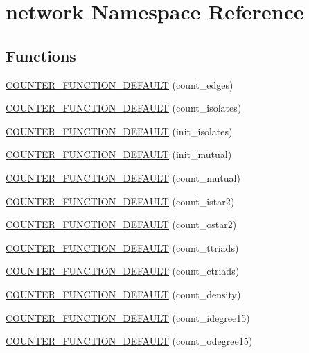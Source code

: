 \hypertarget{namespacenetwork}{}\section{network Namespace Reference}
\label{namespacenetwork}
\subsection*{Functions}
\begin{DoxyCompactItemize}
\item 
\hyperlink{namespacenetwork_a52e5467dc2136f576b9c24e68ce5bb69}{C\+O\+U\+N\+T\+E\+R\+\_\+\+F\+U\+N\+C\+T\+I\+O\+N\+\_\+\+D\+E\+F\+A\+U\+LT} (count\+\_\+edges)
\item 
\hyperlink{namespacenetwork_af8767376332b477ad0be01a2d68b2231}{C\+O\+U\+N\+T\+E\+R\+\_\+\+F\+U\+N\+C\+T\+I\+O\+N\+\_\+\+D\+E\+F\+A\+U\+LT} (count\+\_\+isolates)
\item 
\hyperlink{namespacenetwork_a0df1bc899c523c581cef5489290d1360}{C\+O\+U\+N\+T\+E\+R\+\_\+\+F\+U\+N\+C\+T\+I\+O\+N\+\_\+\+D\+E\+F\+A\+U\+LT} (init\+\_\+isolates)
\item 
\hyperlink{namespacenetwork_a1e12cd378041890c578b5ed2153c93e8}{C\+O\+U\+N\+T\+E\+R\+\_\+\+F\+U\+N\+C\+T\+I\+O\+N\+\_\+\+D\+E\+F\+A\+U\+LT} (init\+\_\+mutual)
\item 
\hyperlink{namespacenetwork_afbe5ab8aa0a6079fc233508861e9edae}{C\+O\+U\+N\+T\+E\+R\+\_\+\+F\+U\+N\+C\+T\+I\+O\+N\+\_\+\+D\+E\+F\+A\+U\+LT} (count\+\_\+mutual)
\item 
\hyperlink{namespacenetwork_a3e6d0bc978cbb2a6306172ddfb80b2a1}{C\+O\+U\+N\+T\+E\+R\+\_\+\+F\+U\+N\+C\+T\+I\+O\+N\+\_\+\+D\+E\+F\+A\+U\+LT} (count\+\_\+istar2)
\item 
\hyperlink{namespacenetwork_af92e2d3fcc16d630145a06ae65ca7c41}{C\+O\+U\+N\+T\+E\+R\+\_\+\+F\+U\+N\+C\+T\+I\+O\+N\+\_\+\+D\+E\+F\+A\+U\+LT} (count\+\_\+ostar2)
\item 
\hyperlink{namespacenetwork_a2bdb873a06e21affe474527ce9065667}{C\+O\+U\+N\+T\+E\+R\+\_\+\+F\+U\+N\+C\+T\+I\+O\+N\+\_\+\+D\+E\+F\+A\+U\+LT} (count\+\_\+ttriads)
\item 
\hyperlink{namespacenetwork_ad8110b709867cea84d51779fedac9a56}{C\+O\+U\+N\+T\+E\+R\+\_\+\+F\+U\+N\+C\+T\+I\+O\+N\+\_\+\+D\+E\+F\+A\+U\+LT} (count\+\_\+ctriads)
\item 
\hyperlink{namespacenetwork_a2e68995185f67126ee08da5b78d1d2ac}{C\+O\+U\+N\+T\+E\+R\+\_\+\+F\+U\+N\+C\+T\+I\+O\+N\+\_\+\+D\+E\+F\+A\+U\+LT} (count\+\_\+density)
\item 
\hyperlink{namespacenetwork_af6d3618f2abd7302ed35590dc073a30e}{C\+O\+U\+N\+T\+E\+R\+\_\+\+F\+U\+N\+C\+T\+I\+O\+N\+\_\+\+D\+E\+F\+A\+U\+LT} (count\+\_\+idegree15)
\item 
\hyperlink{namespacenetwork_a319cbd3e4b2edfce1c569060ea3accaa}{C\+O\+U\+N\+T\+E\+R\+\_\+\+F\+U\+N\+C\+T\+I\+O\+N\+\_\+\+D\+E\+F\+A\+U\+LT} (count\+\_\+odegree15)
\end{DoxyCompactItemize}
